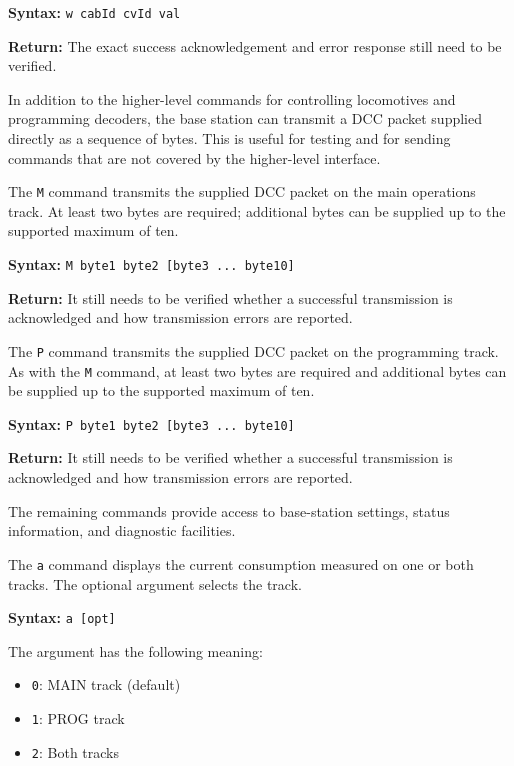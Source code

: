 \textbf{Syntax:} \texttt{w cabId cvId val}

\textbf{Return:} The exact success acknowledgement and error response
still need to be verified.


In addition to the higher-level commands for controlling locomotives and
programming decoders, the base station can transmit a DCC packet supplied
directly as a sequence of bytes. This is useful for testing and for sending
commands that are not covered by the higher-level interface.


The \texttt{M} command transmits the supplied DCC packet on the main
operations track. At least two bytes are required; additional bytes can be
supplied up to the supported maximum of ten.

\textbf{Syntax:} \texttt{M byte1 byte2 [byte3 ... byte10]}

\textbf{Return:} It still needs to be verified whether a successful
transmission is acknowledged and how transmission errors are reported.


The \texttt{P} command transmits the supplied DCC packet on the programming
track. As with the \texttt{M} command, at least two bytes are required and
additional bytes can be supplied up to the supported maximum of ten.

\textbf{Syntax:} \texttt{P byte1 byte2 [byte3 ... byte10]}

\textbf{Return:} It still needs to be verified whether a successful
transmission is acknowledged and how transmission errors are reported.


The remaining commands provide access to base-station settings, status
information, and diagnostic facilities.


The \texttt{a} command displays the current consumption measured on one or
both tracks. The optional argument selects the track.

\textbf{Syntax:} \texttt{a [opt]}

The argument has the following meaning:

\begin{itemize}
    \item \texttt{0}: MAIN track (default)
    \item \texttt{1}: PROG track
    \item \texttt{2}: Both tracks
\end{itemize}

